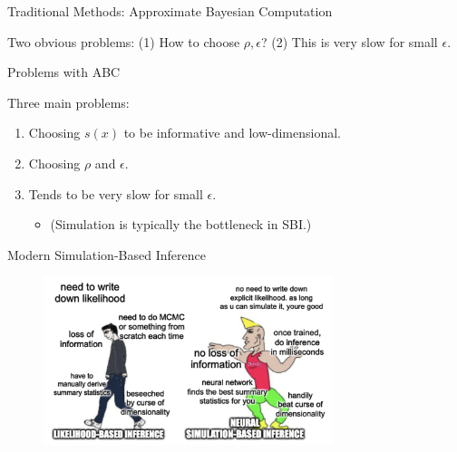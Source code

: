 \documentclass[12pt, aspectratio=169]{beamer}
\let\olditem\item
\renewcommand\item{\olditem\justifying}
\begin{document}
\begin{frame}{Traditional Methods: Approximate Bayesian Computation}
\pause

Two obvious problems: (1) How to choose $\rho, \epsilon$? (2) This is very slow for small $\epsilon$.

\end{frame}

\begin{frame}{Problems with ABC}

Three main problems:
\begin{enumerate}[<+->]
    \item Choosing $s(x)$ to be informative and low-dimensional.
    \item Choosing $\rho$ and $\epsilon$.
    \item Tends to be very slow for small $\epsilon$. 
    \begin{itemize}
        \item (Simulation is typically the bottleneck in SBI.)
    \end{itemize}
\end{enumerate}
\end{frame}





\begin{frame}{Modern Simulation-Based Inference}
	\begin{figure}
		\centering
		\includegraphics[width=0.75\textwidth]{"images/sbi.jpeg"}
	\end{figure}
\end{frame}
\end{document}
